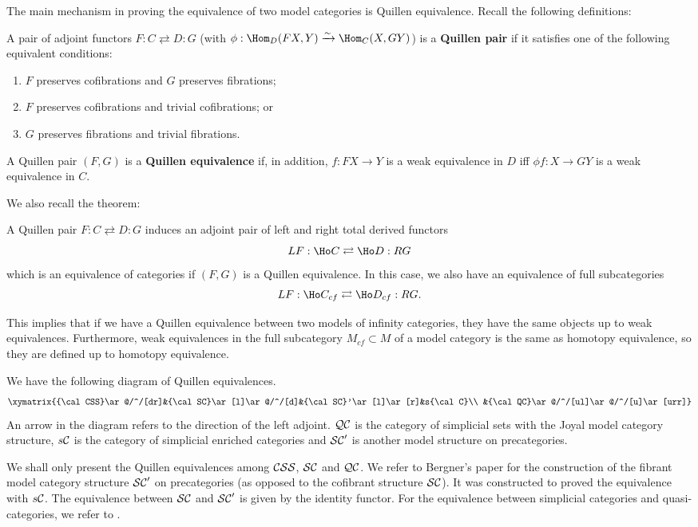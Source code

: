 The main mechanism in proving the equivalence of two model categories is Quillen equivalence. Recall the following definitions:
\begin{defin}
A pair of adjoint functors $F:C\rightleftarrows D:G$ (with $\phi:\Hom_D(FX,Y)\xrightarrow{\sim}\Hom_C(X,GY)$) is a {\bf Quillen pair} if it satisfies one of the following equivalent conditions:
\begin{enumerate}
\item $F$ preserves cofibrations and $G$ preserves fibrations;
\item $F$ preserves cofibrations and trivial cofibrations; or
\item $G$ preserves fibrations and trivial fibrations.
\end{enumerate}
A Quillen pair $(F,G)$ is a {\bf Quillen equivalence} if, in addition, $f:FX\to Y$ is a weak equivalence in $D$ iff $\phi f:X\to GY$ is a weak equivalence in $C$.
\end{defin}
We also recall the theorem:
\begin{thm}
A Quillen pair $F:C\rightleftarrows D:G$ induces an adjoint pair of left and right total derived functors
$$LF:\Ho C\rightleftarrows\Ho D:RG$$
which is an equivalence of categories if $(F,G)$ is a Quillen equivalence. In this case, we also have an equivalence of full subcategories
$$LF:\Ho C_{cf}\rightleftarrows\Ho D_{cf}:RG.$$
\end{thm}
This implies that if we have a Quillen equivalence between two models of infinity categories, they have the same objects up to weak equivalences. Furthermore, weak equivalences in the full subcategory $M_{cf}\subset M$ of a model category is the same as homotopy equivalence, so they are defined up to homotopy equivalence.

We have the following diagram of Quillen equivalences.
$$\xymatrix{{\cal CSS}\ar@/^/[dr]&{\cal SC}\ar[l]\ar@/^/[d]&{\cal SC}'\ar[l]\ar[r]&s{\cal C}\\
&{\cal QC}\ar@/^/[ul]\ar@/^/[u]\ar[urr]}$$
An arrow in the diagram refers to the direction of the left adjoint. ${\cal QC}$ is the category of simplicial sets with the Joyal model category structure, $s{\cal C}$ is the category of simplicial enriched categories and ${\cal SC}'$ is another model structure on precategories.

We shall only present the Quillen equivalences among ${\cal CSS}$, ${\cal SC}$ and ${\cal QC}$. We refer to Bergner's paper \cite{bergner3} for the construction of the fibrant model category structure ${\cal SC}'$ on precategories (as opposed to the cofibrant structure ${\cal SC}$). It was constructed to proved the equivalence with $s{\cal C}$. The equivalence between ${\cal SC}$ and ${\cal SC}'$ is given by the identity functor. For the equivalence between simplicial categories and quasi-categories, we refer to \cite{joyal3}.

